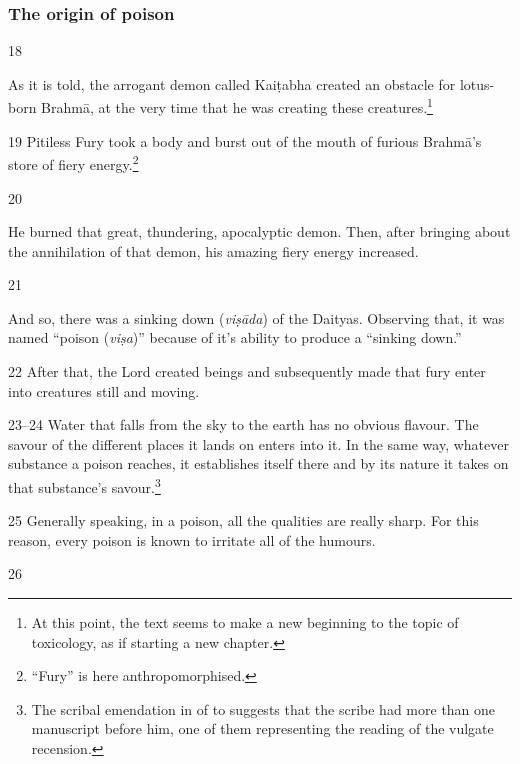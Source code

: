 \subsubsection{The origin of poison}

\begin{translation}[resume]

\item [18]

As it is told, the arrogant demon called Kaiṭabha created an obstacle for
lotus-born Brahmā, at the very time that he was creating these creatures.\footnote{At 
this point, the text seems to make a new beginning to the topic of toxicology, as if 
starting a new chapter.}

\item[19]
Pitiless Fury took a body and burst out of the mouth of furious Brahmā's store of fiery 
energy.\footnote{“Fury” is here anthropomorphised.}

\item[20]

He burned that great, thundering, apocalyptic demon.   Then, after bringing about
the annihilation of that demon, his amazing fiery energy increased.

\item [21]

And so, there was a sinking down (\emph{viṣāda}) of the Daityas.   Observing that,
it was named “poison (\emph{viṣa})” because of it's ability to produce a “sinking
down.”

\item [22] After that, the Lord created beings and subsequently made that fury
enter into creatures still and moving.

\item [23--24] Water that falls from the sky to the earth has no obvious flavour.
The savour of the different places it lands on enters into it.  In the same way,
whatever substance a poison reaches, it establishes itself there and by its nature it 
takes on that substance's savour.\footnote{The scribal emendation in  of  to  suggests that the scribe had more than 
one manuscript before him, one of them representing the reading of the vulgate 
recension.}

\item [25] Generally speaking, in a poison, all the qualities are really sharp. 
For this reason, every poison is known to irritate all of the humours.

\item[26]


\end{translation}
